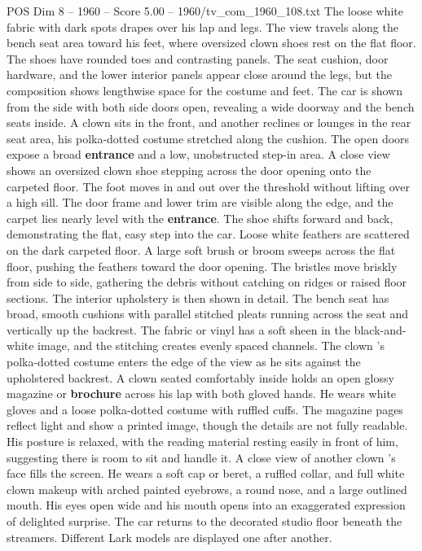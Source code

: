 \begin{textsample}{POS Dim 8 – 1960 – Score 5.00 – 1960/tv\_com\_1960\_108.txt}
The loose white fabric with dark spots drapes over his lap and legs.
The view travels along the bench seat area toward his feet, where oversized clown shoes rest on the flat floor.
The shoes have rounded toes and contrasting panels.
The seat cushion, door hardware, and the lower interior panels appear close around the legs, but the composition shows lengthwise space for the costume and feet.
The car is shown from the side with both side doors open, revealing a wide doorway and the bench seats inside.
A clown sits in the front, and another reclines or lounges in the rear seat area, his polka-dotted costume stretched along the cushion.
The open doors expose a broad \textbf{entrance} and a low, unobstructed step-in area.
A close view shows an oversized clown shoe stepping across the door opening onto the carpeted floor.
The foot moves in and out over the threshold without lifting over a high sill.
The door frame and lower trim are visible along the edge, and the carpet lies nearly level with the \textbf{entrance}.
The shoe shifts forward and back, demonstrating the flat, easy step into the car.
Loose white feathers are scattered on the dark carpeted floor.
A large soft brush or broom sweeps across the flat floor, pushing the feathers toward the door opening.
The bristles move briskly from side to side, gathering the debris without catching on ridges or raised floor sections.
The interior upholstery is then shown in detail.
The bench seat has broad, smooth cushions with parallel stitched pleats running across the seat and vertically up the backrest.
The fabric or vinyl has a soft sheen in the black-and-white image, and the stitching creates evenly spaced channels.
The clown ’s polka-dotted costume enters the edge of the view as he sits against the upholstered backrest.
A clown seated comfortably inside holds an open glossy magazine or \textbf{brochure} across his lap with both gloved hands.
He wears white gloves and a loose polka-dotted costume with ruffled cuffs.
The magazine pages reflect light and show a printed image, though the details are not fully readable.
His posture is relaxed, with the reading material resting easily in front of him, suggesting there is room to sit and handle it.
A close view of another clown ’s face fills the screen.
He wears a soft cap or beret, a ruffled collar, and full white clown makeup with arched painted eyebrows, a round nose, and a large outlined mouth.
His eyes open wide and his mouth opens into an exaggerated expression of delighted surprise.
The car returns to the decorated studio floor beneath the streamers.
Different Lark models are displayed one after another.

\end{textsample}
